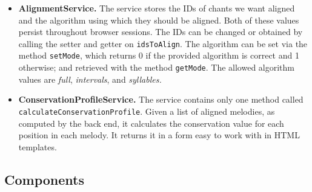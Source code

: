\begin{itemize}
\item\textbf{AlignmentService.} The service stores the IDs of chants we want aligned and the algorithm using which they should be aligned. Both of these values persist
throughout browser sessions. The IDs can be changed or obtained by calling the setter and getter on \verb|idsToAlign|. The algorithm can be set via the method
\verb|setMode|, which returns 0 if the provided algorithm is correct and 1 otherwise; and retrieved with the method \verb|getMode|. The allowed algorithm values are
\emph{full}, \emph{intervals}, and \emph{syllables.}

\item\textbf{ConservationProfileService.} The service contains only one method called \verb|calculateConservationProfile|. Given a list of aligned melodies, as computed by the back end,
it calculates the conservation value for each position in each melody. It returns it in a form easy to work with in HTML templates.

\end{itemize}

\subsection{Components}


